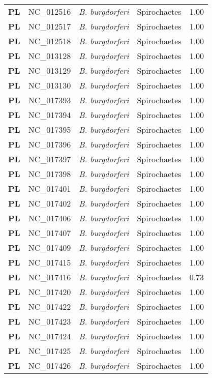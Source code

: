 \begin{adjustwidth}{-3cm}{2cm}
{\begin{supertabular}{>{\bfseries}l|p{0.1\textwidth}p{0.14\textwidth}l|l}
PL & NC\_012516 & \textit{B. burgdorferi} & Spirochaetes & 1.00\\
PL & NC\_012517 & \textit{B. burgdorferi} & Spirochaetes & 1.00\\
PL & NC\_012518 & \textit{B. burgdorferi} & Spirochaetes & 1.00\\
PL & NC\_013128 & \textit{B. burgdorferi} & Spirochaetes & 1.00\\
PL & NC\_013129 & \textit{B. burgdorferi} & Spirochaetes & 1.00\\
PL & NC\_013130 & \textit{B. burgdorferi} & Spirochaetes & 1.00\\
PL & NC\_017393 & \textit{B. burgdorferi} & Spirochaetes & 1.00\\
PL & NC\_017394 & \textit{B. burgdorferi} & Spirochaetes & 1.00\\
PL & NC\_017395 & \textit{B. burgdorferi} & Spirochaetes & 1.00\\
PL & NC\_017396 & \textit{B. burgdorferi} & Spirochaetes & 1.00\\
PL & NC\_017397 & \textit{B. burgdorferi} & Spirochaetes & 1.00\\
PL & NC\_017398 & \textit{B. burgdorferi} & Spirochaetes & 1.00\\
PL & NC\_017401 & \textit{B. burgdorferi} & Spirochaetes & 1.00\\
PL & NC\_017402 & \textit{B. burgdorferi} & Spirochaetes & 1.00\\
PL & NC\_017406 & \textit{B. burgdorferi} & Spirochaetes & 1.00\\
PL & NC\_017407 & \textit{B. burgdorferi} & Spirochaetes & 1.00\\
PL & NC\_017409 & \textit{B. burgdorferi} & Spirochaetes & 1.00\\
PL & NC\_017415 & \textit{B. burgdorferi} & Spirochaetes & 1.00\\
PL & NC\_017416 & \textit{B. burgdorferi} & Spirochaetes & 0.73\\
PL & NC\_017420 & \textit{B. burgdorferi} & Spirochaetes & 1.00\\
PL & NC\_017422 & \textit{B. burgdorferi} & Spirochaetes & 1.00\\
PL & NC\_017423 & \textit{B. burgdorferi} & Spirochaetes & 1.00\\
PL & NC\_017424 & \textit{B. burgdorferi} & Spirochaetes & 1.00\\
PL & NC\_017425 & \textit{B. burgdorferi} & Spirochaetes & 1.00\\
PL & NC\_017426 & \textit{B. burgdorferi} & Spirochaetes & 1.00\\

\end{supertabular}}
\end{adjustwidth}
